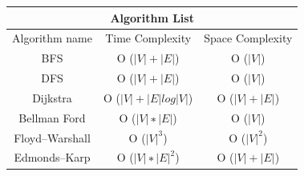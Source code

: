 \documentclass{beamer}
\begin{document}
\begin{frame}
    \begin{center}
    \begin{tabular}{|c||c|c|}
    \hline
    \multicolumn{3}{|c|}{Algorithm List}\\
    \hline
    Algorithm name & Time Complexity & Space Complexity\\
    \hline
    BFS & O ($|V |+ |E |$) & O ($|V |$)\\
DFS &  O ($|V |+ |E |$) & O ($|V |$)\\ \hline
Dijkstra & O ($|V |+|E |log |V |$) & O ($|V |+ |E |$)\\ \hline
Bellman Ford & O ($|V |∗|E |$) &  O ($|V |$)\\ \hline
Floyd–Warshall & O ($|V |^3$)  & O ($|V |^2$)\\ \hline
Edmonds–Karp & O ($|V |∗|E |^2$) & O ($|V |+ |E |$)\\\hline 
         \end{tabular}
\end{center}
\end{frame}
\end{document}

